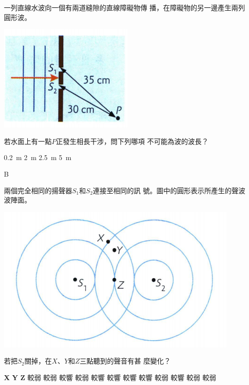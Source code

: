 {
    一列直線水波向一個有兩道縫隙的直線障礙物傳 播，在障礙物的另一邊產生兩列圓形波。
    \par{\par\centering\includegraphics[width=.3\textwidth]{./img/ch3_earlyclass_wave_mc_2024-05-14-12-25-51.png}\par}
    若水面上有一點$P$正發生相長干涉，問下列哪項 不可能為波的波長？
    \begin{tasks}
        \task \qty{0.2}{m}
        \task \qty{2}{m}
        \task \qty{2.5}{m}
        \task \qty{5}{m}
    \end{tasks}

}{\mckey B}
{
    兩個完全相同的揚聲器$S_1$和$S_2$連接至相同的訊 號。圖中的圓形表示所產生的聲波波陣面。
    \par{\par\centering\includegraphics[width=.4\textwidth]{./img/ch3_earlyclass_wave_mc_2024-05-14-12-27-18.png}\par}
    若把$S_2$關掉，在$X$、$Y$和$Z$三點聽到的聲音有甚 麼變化？
    \begin{tasks}
        \task [] \textbf{X} \tab\tab \textbf{Y} \tab\tab \textbf{Z}
        \task 較弱 \tab\tab 較弱 \tab\tab 較響
        \task 較弱 \tab\tab 較響 \tab\tab 較響
        \task 較響 \tab\tab 較響 \tab\tab 較弱
        \task 較響 \tab\tab 較弱 \tab\tab 較弱
    \end{tasks}
}{}

